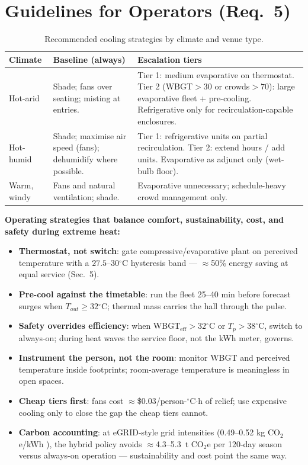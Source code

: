 \documentclass[11pt]{article}
\newcommand{\degrees}{\ensuremath{^\circ}}
\begin{document}
\section{Guidelines for Operators (Req.\ 5)}
\begin{table}[H]\centering\small
\caption{Recommended cooling strategies by climate and venue type.}\label{tab:guide}
\begin{tabular}{@{}p{2.6cm}p{5.2cm}p{6.6cm}@{}}
\toprule
Climate & Baseline (always) & Escalation tiers\\
\midrule
Hot-arid & Shade; fans over seating; misting at entries. & Tier 1: medium evaporative on thermostat. Tier 2 (WBGT${>}30$ or crowds${>}70$): large evaporative fleet + pre-cooling. Refrigerative only for recirculation-capable enclosures.\\
\addlinespace
Hot-humid & Shade; maximise air speed (fans); dehumidify where possible. & Tier 1: refrigerative units on partial recirculation. Tier 2: extend hours / add units. Evaporative as adjunct only (wet-bulb floor).\\
\addlinespace
Warm, windy & Fans and natural ventilation; shade. & Evaporative unnecessary; schedule-heavy crowd management only.\\
\bottomrule
\end{tabular}
\end{table}

\textbf{Operating strategies that balance comfort, sustainability, cost, and safety during extreme heat:}
\begin{itemize}
\item \textbf{Thermostat, not switch}: gate compressive/evaporative plant on perceived temperature with a $27.5$--$30\degrees$C hysteresis band --- $\approx$50\% energy saving at equal service (Sec.~5).
\item \textbf{Pre-cool against the timetable}: run the fleet 25--40 min before forecast surges when $T_{out}\geq32\degrees$C; thermal mass carries the hall through the pulse.
\item \textbf{Safety overrides efficiency}: when WBGT$_{\text{eff}}>32\degrees$C or $T_p>38\degrees$C, switch to always-on; during heat waves the service floor, not the kWh meter, governs.
\item \textbf{Instrument the person, not the room}: monitor WBGT and perceived temperature inside footprints; room-average temperature is meaningless in open spaces.
\item \textbf{Cheap tiers first}: fans cost $\approx$\$0.03/person-$\degrees$C$\cdot$h of relief; use expensive cooling only to close the gap the cheap tiers cannot.
\item \textbf{Carbon accounting}: at eGRID-style grid intensities (0.49--0.52 kg CO$_2$e/kWh \cite{epagrid}), the hybrid policy avoids $\approx$4.3--5.3~t CO$_2$e per 120-day season versus always-on operation --- sustainability and cost point the same way.
\end{itemize}
\end{document}
